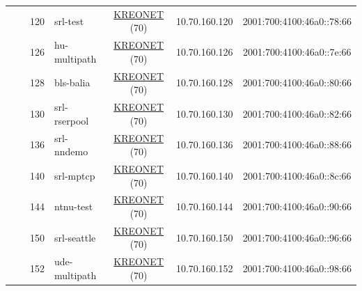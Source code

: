 \begin{small}
\begin{center}
\begin{longtable}{|c|c|c|c|c|c|c|c|}
  &  & \tiny{120} & \multicolumn{1}{|l|}{\tiny{srl-test}} & \multicolumn{2}{|c|}{\tiny{\href{http://www.kreonet.net}{KREONET} (70)}} & \tiny{10.70.160.120} & \tiny{2001:700:4100:46a0::78:66} \\* \cline{3-3}\cline{4-4}\cline{5-5}\cline{6-6}\cline{7-7}\cline{8-8}
  &  & \tiny{126} & \multicolumn{1}{|l|}{\tiny{hu-multipath}} & \multicolumn{2}{|c|}{\tiny{\href{http://www.kreonet.net}{KREONET} (70)}} & \tiny{10.70.160.126} & \tiny{2001:700:4100:46a0::7e:66} \\* \cline{3-3}\cline{4-4}\cline{5-5}\cline{6-6}\cline{7-7}\cline{8-8}
  &  & \tiny{128} & \multicolumn{1}{|l|}{\tiny{bls-balia}} & \multicolumn{2}{|c|}{\tiny{\href{http://www.kreonet.net}{KREONET} (70)}} & \tiny{10.70.160.128} & \tiny{2001:700:4100:46a0::80:66} \\* \cline{3-3}\cline{4-4}\cline{5-5}\cline{6-6}\cline{7-7}\cline{8-8}
  &  & \tiny{130} & \multicolumn{1}{|l|}{\tiny{srl-rserpool}} & \multicolumn{2}{|c|}{\tiny{\href{http://www.kreonet.net}{KREONET} (70)}} & \tiny{10.70.160.130} & \tiny{2001:700:4100:46a0::82:66} \\* \cline{3-3}\cline{4-4}\cline{5-5}\cline{6-6}\cline{7-7}\cline{8-8}
  &  & \tiny{136} & \multicolumn{1}{|l|}{\tiny{srl-nndemo}} & \multicolumn{2}{|c|}{\tiny{\href{http://www.kreonet.net}{KREONET} (70)}} & \tiny{10.70.160.136} & \tiny{2001:700:4100:46a0::88:66} \\* \cline{3-3}\cline{4-4}\cline{5-5}\cline{6-6}\cline{7-7}\cline{8-8}
  &  & \tiny{140} & \multicolumn{1}{|l|}{\tiny{srl-mptcp}} & \multicolumn{2}{|c|}{\tiny{\href{http://www.kreonet.net}{KREONET} (70)}} & \tiny{10.70.160.140} & \tiny{2001:700:4100:46a0::8c:66} \\* \cline{3-3}\cline{4-4}\cline{5-5}\cline{6-6}\cline{7-7}\cline{8-8}
  &  & \tiny{144} & \multicolumn{1}{|l|}{\tiny{ntnu-test}} & \multicolumn{2}{|c|}{\tiny{\href{http://www.kreonet.net}{KREONET} (70)}} & \tiny{10.70.160.144} & \tiny{2001:700:4100:46a0::90:66} \\* \cline{3-3}\cline{4-4}\cline{5-5}\cline{6-6}\cline{7-7}\cline{8-8}
  &  & \tiny{150} & \multicolumn{1}{|l|}{\tiny{srl-seattle}} & \multicolumn{2}{|c|}{\tiny{\href{http://www.kreonet.net}{KREONET} (70)}} & \tiny{10.70.160.150} & \tiny{2001:700:4100:46a0::96:66} \\* \cline{3-3}\cline{4-4}\cline{5-5}\cline{6-6}\cline{7-7}\cline{8-8}
  &  & \tiny{152} & \multicolumn{1}{|l|}{\tiny{ude-multipath}} & \multicolumn{2}{|c|}{\tiny{\href{http://www.kreonet.net}{KREONET} (70)}} & \tiny{10.70.160.152} & \tiny{2001:700:4100:46a0::98:66} \\ \hline

\end{longtable}
\end{center}
\end{small}
